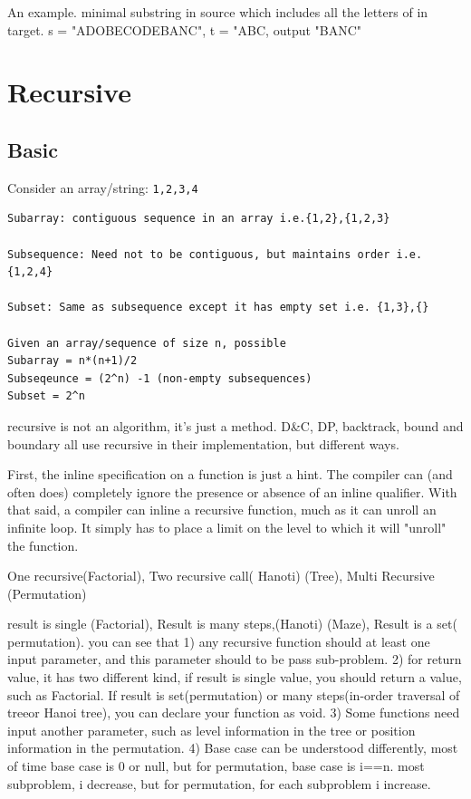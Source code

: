 \documentclass[a4paper,11pt,twoside]{book}
\begin{document}
	\par An example. minimal substring in source which includes all the letters of in target.
	s = "ADOBECODEBANC", t = "ABC, output "BANC"
	

\section{Recursive}
\subsection{Basic}

	\par Consider an array/string: \texttt{{1,2,3,4}}
\begin{lstlisting}
Subarray: contiguous sequence in an array i.e.{1,2},{1,2,3}

Subsequence: Need not to be contiguous, but maintains order i.e. {1,2,4}

Subset: Same as subsequence except it has empty set i.e. {1,3},{}

Given an array/sequence of size n, possible
Subarray = n*(n+1)/2
Subseqeunce = (2^n) -1 (non-empty subsequences)
Subset = 2^n
\end{lstlisting}
	

	\par recursive is not an algorithm, it's just a method. D\&C, DP, backtrack, bound and boundary all use recursive in their implementation, but different ways. 
	
	\par First, the inline specification on a function is just a hint. The compiler can (and often does) completely ignore the presence or absence of an inline qualifier. With that said, a compiler can inline a recursive function, much as it can unroll an infinite loop. It simply has to place a limit on the level to which it will "unroll" the function.

	\par One recursive(Factorial),  Two recursive call( Hanoti) (Tree), Multi Recursive (Permutation)

	\par result is single (Factorial), Result is many steps,(Hanoti) (Maze), Result is a set( permutation). you can see that 1) any recursive function should at least one input parameter, and this parameter should to be pass sub-problem. 2) for return value, it has two different kind, if result is single value, you should return a value, such as Factorial. If result is set(permutation) or many steps(in-order traversal of treeor Hanoi tree), you can declare your function as void. 3) Some functions need input another parameter, such as level information in the tree or position information in the permutation. 4) Base case can be understood differently, most of time base case is 0 or null, but for permutation, base case is i==n.  most subproblem, i decrease, but for permutation, for each subproblem i increase. 
	
\end{document}
